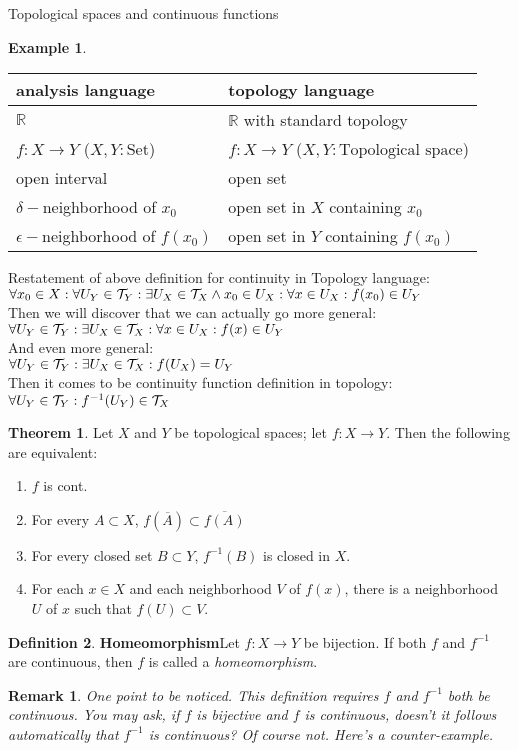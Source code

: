 \documentclass{report}
\newtheorem*{remark}{Remark}
\theoremstyle{definition}
\newtheorem{theorem}{Theorem}[chapter]
\newtheorem{definition}[theorem]{Definition}
\newtheorem{example}{Example}[theorem]
\newcommand{\defn}[1]{\textbf{#1}\label{#1}\index{#1}}
\newcommand{\RR}{\mathbb{R}}
\newcommand{\closure}[1]{\overline{#1}}
\begin{document}
\begin{chapter}{Topological spaces and continuous functions}
\begin{example}
    \begin{table}[H]
      \centering
      \begin{tabular}[H]{ll}
        analysis language & topology language \\
        \hline
        $\RR$ & $\RR$ with standard topology \\
        $f : X \to Y$ ($X,Y: \text{Set}$)
                 & $f : X \to Y$ ($X,Y: \text{Topological space}$) \\
        open interval & open set \\
        $\delta-$neighborhood of $x_0$
                 & open set in $X$ containing $x_0$ \\
        $\epsilon-$neighborhood of $f(x_0)$
                 & open set in $Y$ containing $f(x_0)$
      \end{tabular}
    \end{table}

    Restatement of above definition for continuity in Topology language: \\
    $\forall x_0\in X:\forall U_Y\in\mathcal{T}_Y:\exists U_X\in\mathcal{T}_X\land
    x_0\in U_X:\forall x\in U_X:f(x_0)\in U_Y$ \\
    Then we will discover that we can actually go more general: \\
    $\forall U_Y\in\mathcal{T}_Y:\exists U_X\in\mathcal{T}_X :\forall x\in U_X:f(x)\in
    U_Y$ \\
    And even more general: \\
    $\forall U_Y\in\mathcal{T}_Y:\exists U_X\in\mathcal{T}_X:f(U_X)=U_Y$ \\
    Then it comes to be continuity function definition in topology: \\
    $\forall U_Y\in\mathcal{T}_Y:f^{-1}(U_Y)\in\mathcal{T}_X$
  \end{example}
  \begin{theorem}
    Let $X$ and $Y$ be topological spaces; let $f:X\to Y$. Then the
    following are equivalent:
    \begin{enumerate}
    \item $f$ is cont.
    \item For every $A\subset X$,
      $f(\closure{A})\subset\closure{f(A)}$
    \item For every closed set $B\subset Y$, $f^{-1}(B)$ is closed in
      $X$.
    \item For each $x\in X$ and each neighborhood $V$ of $f(x)$, there
      is a neighborhood $U$ of $x$ such that $f(U)\subset V$.
    \end{enumerate}
  \end{theorem}
  \begin{definition}\defn{Homeomorphism}
    Let $f:X\to Y$ be bijection. If both $f$ and $f^{-1}$ are
    continuous, then $f$ is called a \emph{homeomorphism}.
  \end{definition}
  \begin{remark}
    One point to be noticed. This definition requires $f$ and $f^{-1}$
    both be continuous. You may ask, if $f$ is bijective and $f$ is
    continuous, doesn't it follows automatically that $f^{-1}$ is
    continuous? Of course not. Here's a counter-example.


\end{remark}
\end{chapter}
\end{document}

